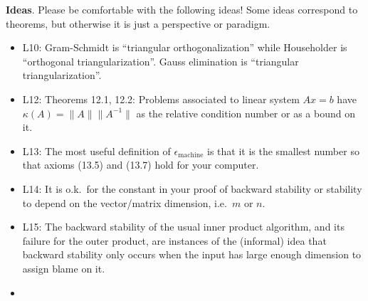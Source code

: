 \documentclass[11pt]{amsart}
\newcommand{\normalspacing}{\renewcommand{\baselinestretch}{1.1}\tiny\normalsize}
\newcommand{\bigspacing}{\renewcommand{\baselinestretch}{1.21}\tiny\normalsize}
\newcommand{\eps}{\epsilon}
\newcommand{\emach}{\eps_{\text{machine}}}
\begin{document}
\normalspacing

\bigskip\noindent \textbf{Ideas}.  Please be comfortable with the following ideas!  Some ideas correspond to theorems, but otherwise it is just a perspective or paradigm.

\bigspacing
\begin{itemize}
\item L10: Gram-Schmidt is ``triangular orthogonalization'' while Householder is ``orthogonal triangularization''.  Gauss elimination is ``triangular triangularization''.
\item L12: Theorems 12.1, 12.2: Problems associated to linear system $Ax=b$ have $\kappa(A)=\|A\|\|A^{-1}\|$ as the relative condition number or as a bound on it.
\item L13: The most useful definition of $\emach$ is that it is the smallest number so that axioms (13.5) and (13.7) hold for your computer.
\item L14: It is o.k.~for the constant in your proof of backward stability or stability to depend on the vector/matrix dimension, i.e.~$m$ or $n$.
\item L15: The backward stability of the usual inner product algorithm, and its failure for the outer product, are instances of the (informal) idea that backward stability only occurs when the input has large enough dimension to assign blame on it.
\item 
\end{itemize}
\end{document}
